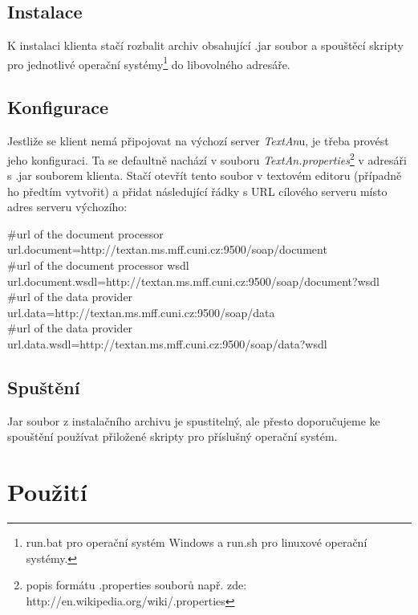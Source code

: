 \documentclass[12pt,a4paper]{report}
\newcommand{\textan}{\emph{TextAn}}
\begin{document}
\subsection{Instalace}
K instalaci klienta stačí rozbalit archiv obsahující .jar soubor a spouštěcí skripty pro jednotlivé operační systémy\footnote{run.bat pro operační systém Windows a run.sh pro linuxové operační systémy.\label{runscript_note}} do libovolného adresáře.

\subsection{Konfigurace}
Jestliže se klient nemá připojovat na výchozí server \textan u, je třeba provést jeho konfiguraci. Ta se defaultně nachází v souboru \emph{TextAn.properties}\footnote{popis formátu .properties souborů např. zde: http://en.wikipedia.org/wiki/.properties} v adresáři s .jar souborem klienta. Stačí otevřít tento soubor v textovém editoru (případně ho předtím vytvořit) a přidat následující řádky s URL cílového serveru místo adres serveru výchozího:
\begin{framed}
\noindent
\#url of the document processor\\
url.document=http://textan.ms.mff.cuni.cz:9500/soap/document\\
\#url of the document processor wsdl\\
url.document.wsdl=http://textan.ms.mff.cuni.cz:9500/soap/document?wsdl\\
\#url of the data provider\\
url.data=http://textan.ms.mff.cuni.cz:9500/soap/data\\
\#url of the data provider\\
url.data.wsdl=http://textan.ms.mff.cuni.cz:9500/soap/data?wsdl
\end{framed}

\subsection{Spuštění}
Jar soubor z instalačního archivu je spustitelný, ale přesto doporučujeme ke spouštění používat přiložené skripty pro příslušný operační systém.


\section{Použití}
\end{document}
